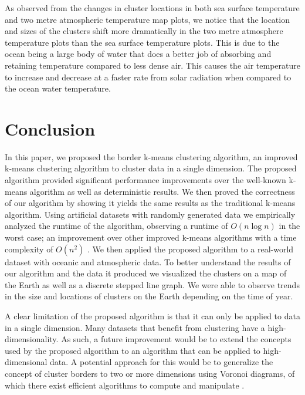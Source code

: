 \documentclass[conference,compsoc]{IEEEtran}
\begin{document}
As observed from the changes in cluster locations in both sea surface temperature and two metre atmospheric temperature map plots, we notice that the location and sizes of the clusters shift more dramatically in the two metre atmosphere temperature plots than the sea surface temperature plots. This is due to the ocean being a large body of water that does a better job of absorbing and retaining temperature compared to less dense air. This causes the air temperature to increase and decrease at a faster rate from solar radiation when compared to the ocean water temperature.



\section{Conclusion}

In this paper, we proposed the border k-means clustering algorithm, an improved k-means clustering algorithm to cluster data in a single dimension. The proposed algorithm provided significant performance improvements over the well-known k-means algorithm as well as deterministic results. We then proved the correctness of our algorithm by showing it yields the same results as the traditional k-means algorithm. Using artificial datasets with randomly generated data we empirically analyzed the runtime of the algorithm, observing a runtime of $O(n \log n)$ in the worst case; an improvement over other improved k-means algorithms with a time complexity of $O(n^2)$ \cite{b1}. We then applied the proposed algorithm to a real-world dataset with oceanic and atmospheric data. To better understand the results of our algorithm and the data it produced we visualized the clusters on a map of the Earth as well as a discrete stepped line graph. We were able to observe trends in the size and locations of clusters on the Earth depending on the time of year.

A clear limitation of the proposed algorithm is that it can only be applied to data in a single dimension. Many datasets that benefit from clustering have a high-dimensionality. As such, a future improvement would be to extend the concepts used by the proposed algorithm to an algorithm that can be applied to high-dimensional data. A potential approach for this would be to generalize the concept of cluster borders to two or more dimensions using Voronoi diagrams, of which there exist efficient algorithms to compute and manipulate \cite{b10}.
\end{document}
